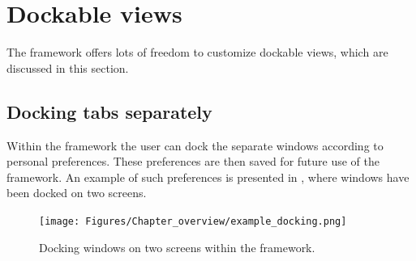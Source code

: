 
\section{Dockable views}
\label{sec:dockableviews}
The  framework offers lots of freedom to customize dockable views, which are discussed in this section.
\subsection{Docking tabs separately}
\label{subsec:dockingtabs}
Within the  framework the user can dock the separate windows according to personal preferences. These preferences are then saved for future use of the framework. An example of such preferences is presented in , where windows have been docked on two screens.
%
\begin{figure} [H]
	\centering
		\texttt{[image: Figures/Chapter\_overview/example\_docking.png]}
	\caption{Docking windows on two screens within the framework.}
	\label{fig:exampledocking}
\end{figure}

